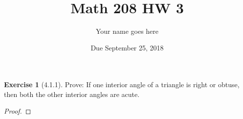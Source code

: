 \documentclass[12pt]{article}		%
\title{Math 208 HW 3}
\author{Your name goes here}
\date{Due September 25, 2018}
\theoremstyle{definition}
\newtheorem*{ex}{Exercise}
\begin{document}
	\maketitle
	
	
\begin{ex}[4.1.1]
	Prove: If one interior angle of a triangle is right or obtuse, then both the other interior angles are acute.
\end{ex}

\begin{proof} 
	
\end{proof}

\vspace{1in} %
	
	
	

	
	
	
\end{document}
